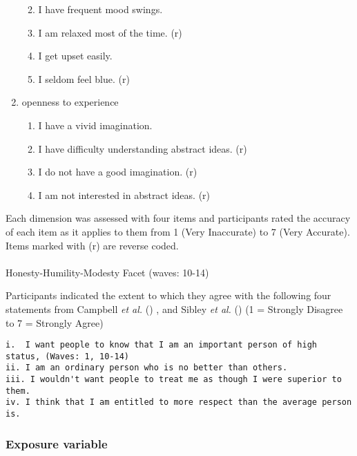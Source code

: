 \documentclass[
  singlecolumn,
  9pt]{article}
\makeatletter
\let\oldparagraph\paragraph
\renewcommand{\paragraph}{
    \@ifstar
      \xxxParagraphStar
      \xxxParagraphNoStar
  }
\newcommand{\xxxParagraphStar}[1]{\oldparagraph*{#1}\mbox{}}
\newcommand{\xxxParagraphNoStar}[1]{\oldparagraph{#1}\mbox{}}
\providecommand{\tightlist}{%
  \setlength{\itemsep}{0pt}\setlength{\parskip}{0pt}}\usepackage{longtable,booktabs,array}
\makeatother
\begin{document}
\begin{enumerate}
  \begin{enumerate}
  \def\labelenumii{\roman{enumii}.}
  \tightlist
  \item
    I have frequent mood swings.
  \item
    I am relaxed most of the time. (r)
  \item
    I get upset easily.
  \item
    I seldom feel blue. (r)
  \end{enumerate}
\item
  openness to experience

  \begin{enumerate}
  \def\labelenumii{\roman{enumii}.}
  \tightlist
  \item
    I have a vivid imagination.
  \item
    I have difficulty understanding abstract ideas. (r)
  \item
    I do not have a good imagination. (r)
  \item
    I am not interested in abstract ideas. (r)
  \end{enumerate}
\end{enumerate}

Each dimension was assessed with four items and participants rated the
accuracy of each item as it applies to them from 1 (Very Inaccurate) to
7 (Very Accurate). Items marked with (r) are reverse coded.

\paragraph{Honesty-Humility-Modesty Facet (waves:
10-14)}\label{honesty-humility-modesty-facet-waves-10-14}

Participants indicated the extent to which they agree with the following
four statements from Campbell \emph{et al.}
() , and Sibley \emph{et al.}
() (1 = Strongly Disagree to 7 = Strongly
Agree)

\begin{verbatim}
i.  I want people to know that I am an important person of high status, (Waves: 1, 10-14)
ii. I am an ordinary person who is no better than others.
iii. I wouldn't want people to treat me as though I were superior to them.
iv. I think that I am entitled to more respect than the average person is.
\end{verbatim}

\subsubsection{Exposure variable}\label{exposure-variable}
\end{document}
